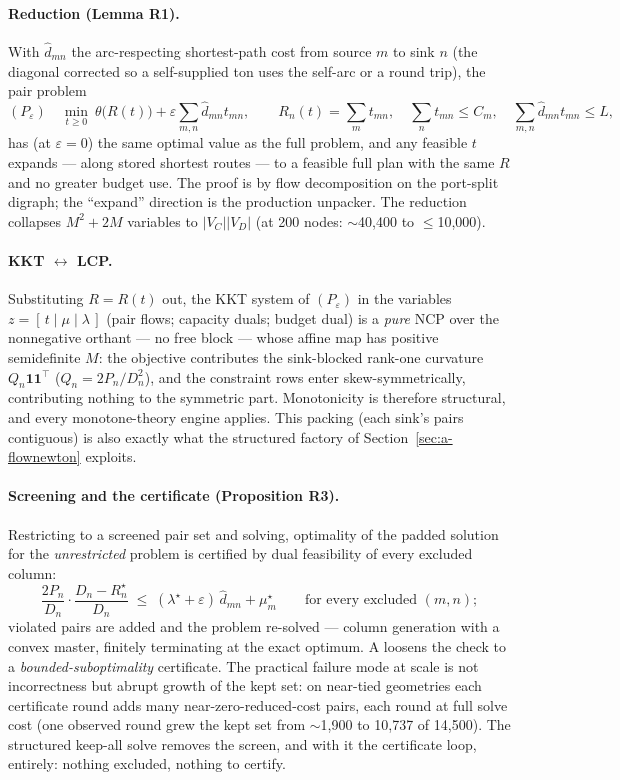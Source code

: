 \paragraph{Reduction (Lemma R1).} With $\hat d_{mn}$ the arc-respecting
shortest-path cost from source $m$ to sink $n$ (the diagonal corrected so a
self-supplied ton uses the self-arc or a round trip), the pair problem
\[
(P_\varepsilon)\quad
\min_{t \ge 0}\ \theta\bigl(R(t)\bigr)
+ \varepsilon \sum_{m,n} \hat d_{mn} t_{mn},
\qquad
R_n(t) = \sum_m t_{mn},\quad
\sum_n t_{mn} \le C_m,\quad
\sum_{m,n} \hat d_{mn} t_{mn} \le L,
\]
has (at $\varepsilon = 0$) the same optimal value as the full problem, and
any feasible $t$ expands --- along stored shortest routes --- to a feasible
full plan with the same $R$ and no greater budget use. The proof is by flow
decomposition on the port-split digraph; the ``expand'' direction is the
production unpacker. The reduction collapses $M^2 + 2M$ variables to
$|V_C||V_D|$ (at 200 nodes: $\sim$40{,}400 to $\le$10{,}000).

\paragraph{KKT $\leftrightarrow$ LCP.} Substituting $R = R(t)$ out, the KKT
system of $(P_\varepsilon)$ in the variables
$z = [\,t \mid \mu \mid \lambda\,]$ (pair flows; capacity duals; budget
dual) is a \emph{pure} NCP over the nonnegative orthant --- no free block
--- whose affine map has positive semidefinite $M$: the objective
contributes the sink-blocked rank-one curvature $Q_n \mathbf{1}\mathbf{1}^\top$
($Q_n = 2P_n/D_n^2$), and the constraint rows enter skew-symmetrically,
contributing nothing to the symmetric part. Monotonicity is therefore
structural, and every monotone-theory engine applies. This packing (each
sink's pairs contiguous) is also exactly what the structured factory of
Section~\ref{sec:a-flownewton} exploits.

\paragraph{Screening and the certificate (Proposition R3).} Restricting to
a screened pair set and solving, optimality of the padded solution for the
\emph{unrestricted} problem is certified by dual feasibility of every
excluded column:
\[
\frac{2P_n}{D_n}\cdot\frac{D_n - R_n^\star}{D_n}
\;\le\; (\lambda^\star + \varepsilon)\,\hat d_{mn} + \mu_m^\star
\qquad \text{for every excluded } (m,n);
\]
violated pairs are added and the problem re-solved --- column generation
with a convex master, finitely terminating at the exact optimum. A
 loosens the check to a \emph{bounded-suboptimality}
certificate. The practical failure mode at scale is not incorrectness but
abrupt growth of the kept set: on near-tied geometries each certificate
round adds many near-zero-reduced-cost pairs, each round at full solve
cost (one observed round grew the kept set from $\sim$1{,}900 to 10{,}737
of 14{,}500). The structured keep-all solve removes the screen, and with
it the certificate loop, entirely: nothing excluded, nothing to certify.

